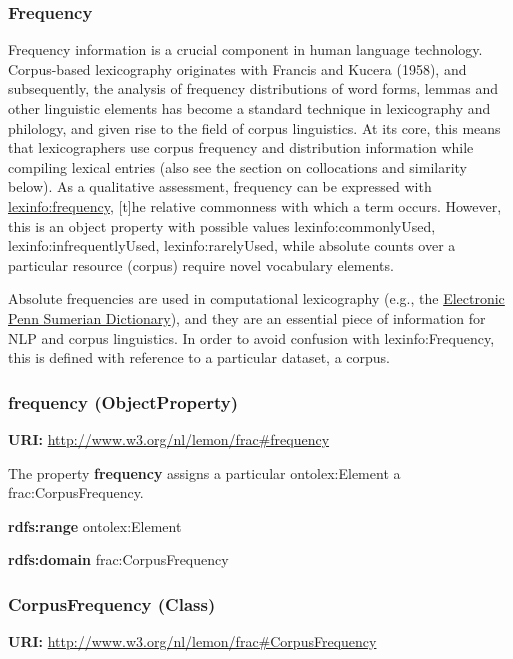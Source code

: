 \documentclass[a4paper]{article}
\newcommand\textstyleInternetlink[1]{\textcolor[rgb]{0.0,0.0,0.5019608}{#1}}
\newcommand\textstyleStrongEmphasis[1]{\textbf{#1}}
\begin{document}
\subsubsection{Frequency}
Frequency information is a crucial component in human language technology. Corpus-based lexicography originates with Francis and Kucera (1958), and subsequently, the analysis of frequency distributions of word forms, lemmas and other linguistic elements has become a standard technique in lexicography and philology, and given rise to the field of corpus linguistics. At its core, this means that lexicographers use corpus frequency and distribution information while compiling lexical entries (also see the section on collocations and similarity below). As a qualitative assessment, frequency can be expressed with \href{http://www.lexinfo.net/ontology/2.0/lexinfo#frequency}{\textstyleInternetlink{lexinfo:frequency}}, {\textquotedbl}[t]he relative commonness with which a term occurs{\textquotedbl}. However, this is an object property with possible values lexinfo:commonlyUsed, lexinfo:infrequentlyUsed, lexinfo:rarelyUsed, while absolute counts over a particular resource (corpus) require novel vocabulary elements. 

Absolute frequencies are used in computational lexicography (e.g., the \href{http://oracc.museum.upenn.edu/epsd2/}{\textstyleInternetlink{Electronic Penn Sumerian Dictionary}}), and they are an essential piece of information for NLP and corpus linguistics. In order to avoid confusion with lexinfo:Frequency, this is defined with reference to a particular dataset, a corpus. 

\subsubsection[frequency (ObjectProperty)]{frequency (ObjectProperty)}
\textstyleStrongEmphasis{URI:} \url{http://www.w3.org/nl/lemon/frac#frequency}

The property \textstyleStrongEmphasis{frequency} assigns a particular ontolex:Element a frac:CorpusFrequency.

\textstyleStrongEmphasis{rdfs:range} ontolex:Element

\textstyleStrongEmphasis{rdfs:domain} frac:CorpusFrequency

\subsubsection[CorpusFrequency (Class)]{CorpusFrequency (Class)}
\textstyleStrongEmphasis{URI:} \url{http://www.w3.org/nl/lemon/frac#CorpusFrequency}
\end{document}
